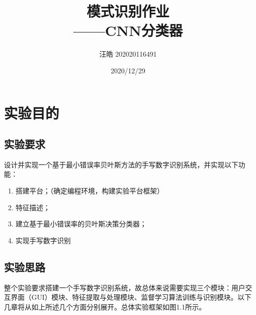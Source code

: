 \documentclass[UTF8, a4paper, 12pt]{report}
\title{模式识别作业\\——CNN分类器}
\author{汪皓 202020116491}
\date{2020/12/29}
\begin{document}
\maketitle %
\thispagestyle{empty} %
\clearpage %

\pagestyle{plain} %
\setcounter{page}{1} %
\tableofcontents %
\clearpage

\pagestyle{fancy} %
\setcounter{page}{1} %

\chapter{实验目的}
	\section{实验要求}
		设计并实现一个基于最小错误率贝叶斯方法的手写数字识别系统，并实现以下功能：
		\begin{enumerate}[itemindent=1em]
			\renewcommand{\labelenumi}{\theenumi)}
			\item 搭建平台；（确定编程环境，构建实验平台框架）
			\item 特征描述；
			\item 建立基于最小错误率的贝叶斯决策分类器；
			\item 实现手写数字识别
		\end{enumerate}

	\section{实验思路}
		整个实验要求搭建一个手写数字识别系统，故总体来说需要实现三个模块：用户交互界面（GUI）模块、特征提取与处理模块、监督学习算法训练与识别模块。以下几章将从如上所述几个方面分别展开。总体实验框架如图1.1所示。
\end{document}

